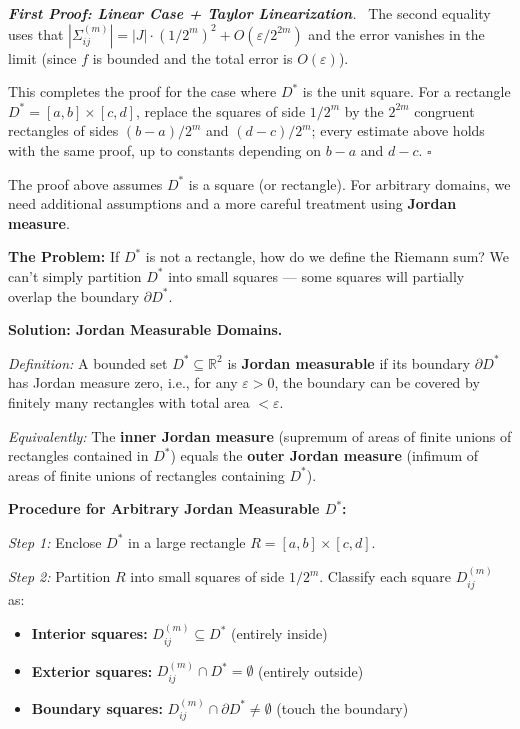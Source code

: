 \documentclass[11pt]{report}
\renewenvironment{proof}[1][Proof]{\par\noindent\textit{#1.}\ }{\hfill$\square$\par\medskip}
\newcommand{\R}{\mathbb{R}}
\begin{document}
\begin{proof}[\textbf{First Proof: Linear Case + Taylor Linearization}]
The second equality uses that $|\Sigma_{ij}^{(m)}| = |J| \cdot (1/2^m)^2 + O(\varepsilon/2^{2m})$ and the error vanishes in the limit (since $f$ is bounded and the total error is $O(\varepsilon)$).

This completes the proof for the case where $D^*$ is the unit square. For a rectangle $D^* = [a, b] \times [c, d]$, replace the squares of side $1/2^m$ by the $2^{2m}$ congruent rectangles of sides $(b - a)/2^m$ and $(d - c)/2^m$; every estimate above holds with the same proof, up to constants depending on $b - a$ and $d - c$. \qedhere
\end{proof}

\begin{remark}
The proof above assumes $D^*$ is a square (or rectangle). For arbitrary domains, we need additional assumptions and a more careful treatment using \textbf{Jordan measure}.

\textbf{The Problem:} If $D^*$ is not a rectangle, how do we define the Riemann sum? We can't simply partition $D^*$ into small squares --- some squares will partially overlap the boundary $\partial D^*$.

\textbf{Solution: Jordan Measurable Domains.}

\textit{Definition:} A bounded set $D^* \subseteq \R^2$ is \textbf{Jordan measurable} if its boundary $\partial D^*$ has Jordan measure zero, i.e., for any $\varepsilon > 0$, the boundary can be covered by finitely many rectangles with total area $< \varepsilon$.

\textit{Equivalently:} The \textbf{inner Jordan measure} (supremum of areas of finite unions of rectangles contained in $D^*$) equals the \textbf{outer Jordan measure} (infimum of areas of finite unions of rectangles containing $D^*$).

\textbf{Procedure for Arbitrary Jordan Measurable $D^*$:}

\textit{Step 1:} Enclose $D^*$ in a large rectangle $R = [a, b] \times [c, d]$.

\textit{Step 2:} Partition $R$ into small squares of side $1/2^m$. Classify each square $D_{ij}^{(m)}$ as:
\begin{itemize}
    \item \textbf{Interior squares:} $D_{ij}^{(m)} \subseteq D^*$ (entirely inside)
    \item \textbf{Exterior squares:} $D_{ij}^{(m)} \cap D^* = \emptyset$ (entirely outside)
    \item \textbf{Boundary squares:} $D_{ij}^{(m)} \cap \partial D^* \neq \emptyset$ (touch the boundary)
\end{itemize}


\end{remark}
\end{document}
